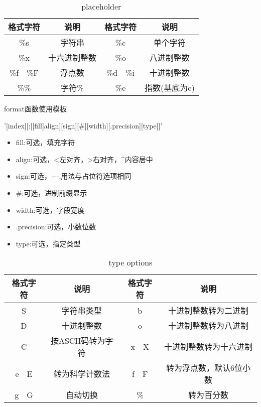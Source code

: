 \documentclass{article}
\begin{document}
        \begin{table}[H]
          \centering
          \caption{placeholder}
          \label{tab:placeholder}
          \begin{tabular}{cccc}
            \toprule[1.5pt]
            格式字符 & 说明 & 格式字符 & 说明 \\
            \midrule
            \%s & 字符串 & \%c & 单个字符 \\
            \%x & 十六进制整数 & \%o & 八进制整数 \\
            \%f~~\%F & 浮点数 & \%d~~\%i & 十进制整数 \\
            \%\% & 字符\% & \%e & 指数(基底为e) \\
            \bottomrule[1.5pt]
          \end{tabular}
        \end{table}
    
        format函数使用模板
        \begin{codeblock}[language=python, caption={format string}]
          '{[index][:[[fill]align][sign][#][width][.precision][type]]}'
        \end{codeblock}

        \begin{itemize}
          \item fill:可选，填充字符
          \item align:可选，<左对齐，>右对齐，\^{}内容居中
          \item sign:可选，+-,用法与占位符选项相同
          \item \#:可选，进制前缀显示
          \item width:可选，字段宽度
          \item .precision:可选，小数位数
          \item type:可选，指定类型
        \end{itemize}

        \begin{table}[H]
          \centering
          \caption{type options}
          \label{tab:type options}
          \begin{tabular}{cccc}
            \toprule[1.5pt]
            格式字符 & 说明 & 格式字符 & 说明 \\
            \midrule
            S & 字符串类型 & b & 十进制整数转为二进制 \\
            D & 十进制整数 & o & 十进制整数转为八进制 \\
            C & 按ASCII码转为字符 & x~~X & 十进制整数转为十六进制 \\
            e~~E & 转为科学计数法 & f~~F & 转为浮点数，默认6位小数 \\
            g~~G & 自动切换 & \% & 转为百分数 \\
            \bottomrule[1.5pt]
          \end{tabular}
        \end{table}
\end{document}
